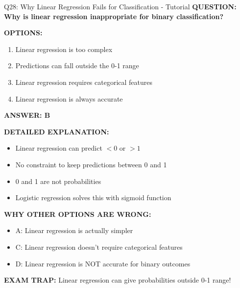 \documentclass[8pt]{beamer}
\begin{document}
	\begin{frame}{Q28: Why Linear Regression Fails for Classification - Tutorial}
		\fontsize{6.5}{7.5}\selectfont
		\textbf{QUESTION: Why is linear regression inappropriate for binary classification?}
		
		\vspace{0.1cm}
		\textbf{OPTIONS:}
		\begin{enumerate}
			\item Linear regression is too complex
			\item Predictions can fall outside the 0-1 range
			\item Linear regression requires categorical features
			\item Linear regression is always accurate
		\end{enumerate}
		
		\vspace{0.1cm}
		\textcolor{myblue}{\textbf{ANSWER: B}}
		
		\vspace{0.1cm}
		\textbf{DETAILED EXPLANATION:}
		\begin{itemize}
			\item Linear regression can predict $< 0$ or $> 1$
			\item No constraint to keep predictions between 0 and 1
			\item 0 and 1 are not probabilities
			\item Logistic regression solves this with sigmoid function
		\end{itemize}
		
		\vspace{0.1cm}
		\textcolor{myred}{\textbf{WHY OTHER OPTIONS ARE WRONG:}}
		\begin{itemize}
			\item \textcolor{myred}{A:} Linear regression is actually simpler
			\item \textcolor{myred}{C:} Linear regression doesn't require categorical features
			\item \textcolor{myred}{D:} Linear regression is NOT accurate for binary outcomes
		\end{itemize}
		
		\textcolor{myred}{\textbf{EXAM TRAP:}} Linear regression can give \textcolor{myblue}{probabilities outside 0-1} range!
	\end{frame}
	
\end{document}

